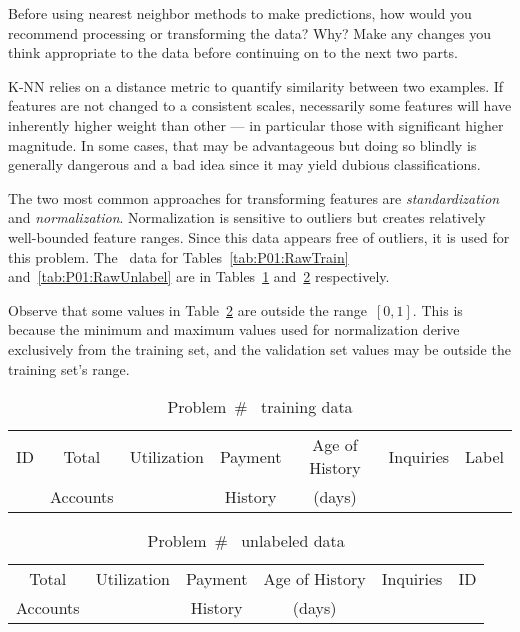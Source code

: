 \begin{subproblem}
  Before using nearest neighbor methods to make predictions, how would you recommend processing or transforming the data? Why? Make any changes you think appropriate to the data before continuing on to the next two parts.
\end{subproblem}

K-NN relies on a distance metric to quantify similarity between two examples.  If features are not changed to a consistent scales, necessarily some features will have inherently higher weight than other --- in particular those with significant higher magnitude.  In some cases, that may be advantageous but doing so blindly is generally dangerous and a bad idea since it may yield dubious classifications.

The two most common approaches for transforming features are \textit{standardization} and \textit{normalization}.  Normalization is sensitive to outliers but creates relatively well-bounded feature ranges.  Since this data appears free of outliers, it is used for this problem. The \featureOp\ data for Tables~\ref{tab:P01:RawTrain} and~\ref{tab:P01:RawUnlabel} are in Tables~\ref{tab:P01:TransformTrain} and~\ref{tab:P01:TransformUnlabel} respectively.

Observe that some values in Table~\ref{tab:P01:TransformUnlabel} are outside the range~$[0,1]$.  This is because the minimum and maximum values used for normalization derive exclusively from the training set, and the validation set values may be outside the training set's range.

\begin{table}[ht]
  \centering
  \caption{Problem~\# \featureOp\ training data}\label{tab:P01:TransformTrain}
  \begin{tabular}{|c||c|c|c|c|c|c|}
    \hline
    ID & Total    & Utilization & Payment & Age of History & Inquiries & Label \\
       & Accounts &             & History & (days)         &           & \\\hline\hline
    
  \end{tabular}
\end{table}

\begin{table}[ht]
  \centering
  \caption{Problem~\# \featureOp\ unlabeled data}\label{tab:P01:TransformUnlabel}
  \begin{tabular}{|c|c|c|c|c||c|}
    \hline
    Total    & Utilization & Payment & Age of History & Inquiries & ID \\
    Accounts &             & History & (days)         &           & \\\hline\hline
    
  \end{tabular}
\end{table}

